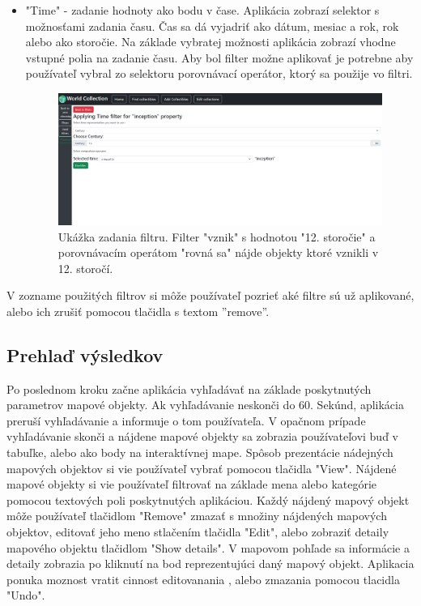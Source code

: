 \begin{itemize}
\begin{figure}[h]
{                        väčšia ako 1000 metrov.}
            \end{figure}
      \item "Time" - zadanie hodnoty ako bodu v čase. Aplikácia zobrazí selektor s možnosťami zadania času. Čas sa dá vyjadriť ako dátum, mesiac a rok, rok alebo ako storočie.
            Na základe vybratej možnosti aplikácia zobrazí vhodne vstupné polia na zadanie času.
            Aby bol filter možne aplikovať je potrebne aby používateľ vybral zo selektoru porovnávací operátor, ktorý sa použije vo filtri.
            \begin{figure}[h]
                  \includegraphics[width=140mm]{../img/ud-time-filter.png}
                  \centering
                  \caption{Ukážka zadania filtru. Filter "vznik" s hodnotou "12. storočie" a porovnávacím operátom "rovná sa" nájde objekty ktoré vznikli v 12. storočí.}
            \end{figure}
\end{itemize}
V zozname použitých filtrov si môže používateľ pozrieť aké filtre sú už aplikované, alebo ich zrušiť pomocou tlačidla s textom ”remove”.

\subsection*{Prehlaď výsledkov}
Po poslednom kroku začne aplikácia vyhľadávať na základe poskytnutých parametrov mapové objekty.
Ak vyhľadávanie neskonči do 60. Sekúnd, aplikácia preruší vyhľadávanie a informuje o tom používateľa.
V opačnom prípade vyhľadávanie skonči a nájdene mapové objekty sa zobrazia používateľovi buď v tabuľke, alebo ako body na interaktívnej mape.
Spôsob prezentácie nádejných mapových objektov si vie používateľ vybrať pomocou tlačidla "View".
Nájdené mapové objekty si vie používateľ filtrovať na základe mena alebo kategórie pomocou textových poli poskytnutých aplikáciou.
Každý nájdený mapový objekt môže používateľ tlačidlom "Remove" zmazať s množiny nájdených mapových objektov, editovať jeho meno stlačením tlačidla "Edit", alebo zobraziť detaily mapového objektu tlačidlom "Show details".
V mapovom pohľade sa informácie a detaily zobrazia po kliknutí na bod reprezentujúci daný mapový objekt.
Aplikacia ponuka moznost vratit cinnost editovanania , alebo zmazania pomocou tlacidla "Undo".

